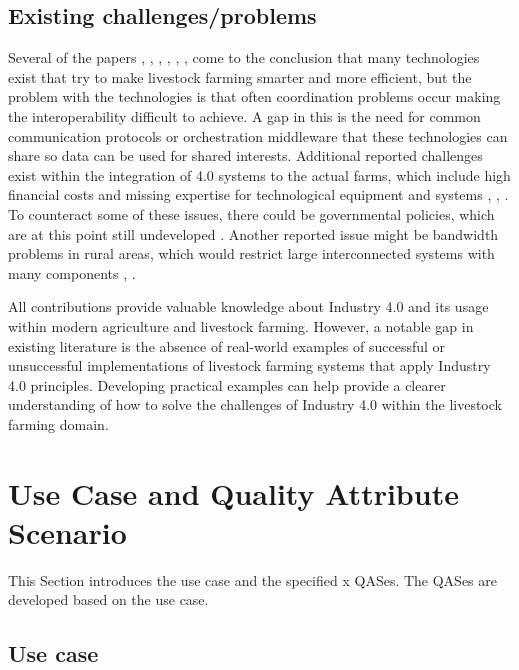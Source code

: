 \documentclass[conference]{IEEEtran}
\begin{document}
\subsection{Existing challenges/problems}
Several of the papers \cite{pr7010036}, \cite{KRUIZE201612}, \cite{app122412844}, \cite{agronomy12030750}, \cite{s22124319}, \cite{9516818}, \cite{ZHANG2021127712} come to the conclusion that many technologies exist that try to make livestock farming smarter and more efficient, but the problem with the technologies is that often coordination problems occur making the interoperability difficult to achieve. A gap in this is the need for common communication protocols or orchestration middleware that these technologies can share so data can be used for shared interests.
Additional reported challenges exist within the integration of 4.0 systems to the actual farms, which include high financial costs and missing expertise for technological equipment and systems \cite{app122412844}, \cite{s22124319}, \cite{ZHANG2021127712}. To counteract some of these issues, there could be governmental policies, which are at this point still undeveloped \cite{pr7010036}.
Another reported issue might be bandwidth problems in rural areas, which would restrict large interconnected systems with many components \cite{pr7010036}, \cite{s22124319}.
\newline

All contributions provide valuable knowledge about Industry 4.0 and its usage within modern agriculture and livestock farming. However, a notable gap in existing literature is the absence of real-world examples of successful or unsuccessful implementations of livestock farming systems that apply Industry 4.0 principles. Developing practical examples can help provide a clearer understanding of how to solve the challenges of Industry 4.0 within the livestock farming domain.


\section{Use Case and Quality Attribute Scenario}
\label{sec:use_case_and_qas}
This Section introduces the use case and the specified x QASes.
The QASes are developed based on the use case.

\subsection{Use case}
\label{sec:use_case}
\end{document}

